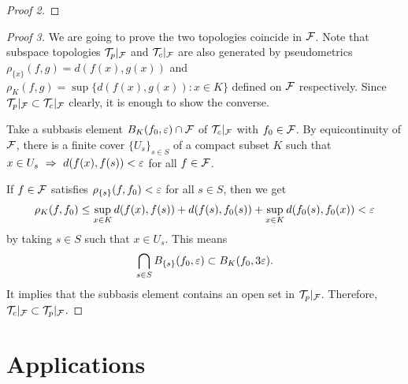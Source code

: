 \documentclass{../exp}
\begin{document}
\begin{proof}[Proof 2]

\end{proof}

\begin{proof}[Proof 3]
We are going to prove the two topologies coincide in $\mathcal{F}$.
Note that subspace topologies $\mathcal{T}_p\vert_{\mathcal{F}}$ and $\mathcal{T}_c\vert_{\mathcal{F}}$ are also generated by pseudometrics $\rho_{\{x\}}(f,g)=d(f(x),g(x))$ and $\rho_K(f,g)=\sup\{d(f(x),g(x)):x\in K\}$ defined on $\mathcal{F}$ respectively.
Since $\mathcal{T}_p\vert_{\mathcal{F}}\subset\mathcal{T}_c\vert_{\mathcal{F}}$ clearly, it is enough to show the converse.

Take a subbasis element $B_K(f_0,\varepsilon)\cap\mathcal{F}$ of $\mathcal{T}_c\vert_{\mathcal{F}}$ with $f_0\in\mathcal{F}$.
By equicontinuity of $\mathcal{F}$, there is a finite cover $\{U_s\}_{s\in S}$ of a compact subset $K$ such that $x\in U_s\,\,\Rightarrow\,\,d(f(x),f(s))<\varepsilon$ for all $f\in\mathcal{F}$.

If $f\in\mathcal{F}$ satisfies $\rho_{\{s\}}(f,f_0)<\varepsilon$ for all $s\in S$, then we get
\[\rho_K(f,f_0)\le\sup_{x\in K}d(f(x),f(s))+d(f(s),f_0(s))+\sup_{x\in K}d(f_0(s),f_0(x))<\varepsilon\]
by taking $s\in S$ such that $x\in U_s$.
This means
\[\bigcap_{s\in S}B_{\{s\}}(f_0,\varepsilon)\subset B_K(f_0,3\varepsilon).\]
It implies that the subbasis element contains an open set in $\mathcal{T}_p\vert_{\mathcal{F}}$.
Therefore, $\mathcal{T}_c\vert_{\mathcal{F}}\subset\mathcal{T}_p\vert_{\mathcal{F}}$.
\end{proof}


\section{Applications}
\end{document}
